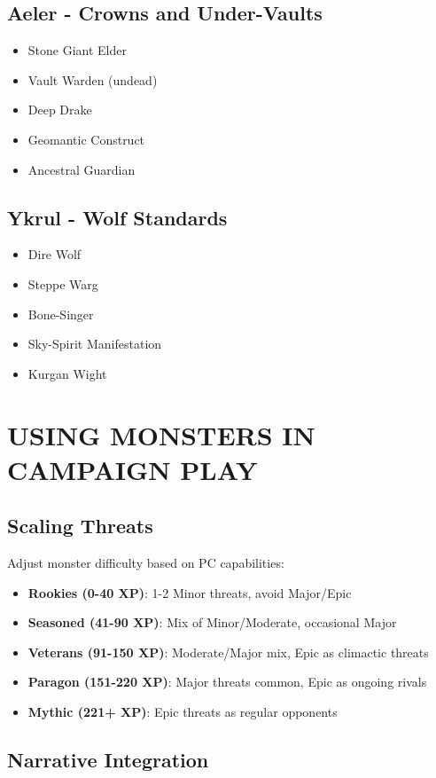 \documentclass[12pt]{article}
\begin{document}
\begin{itemize}
\subsection*{Aeler - Crowns and Under-Vaults}
\begin{itemize}
\item Stone Giant Elder
\item Vault Warden (undead)
\item Deep Drake
\item Geomantic Construct
\item Ancestral Guardian
\end{itemize}

\subsection*{Ykrul - Wolf Standards}
\begin{itemize}
\item Dire Wolf
\item Steppe Warg
\item Bone-Singer
\item Sky-Spirit Manifestation
\item Kurgan Wight
\end{itemize}

\section{USING MONSTERS IN CAMPAIGN PLAY}

\subsection*{Scaling Threats}

Adjust monster difficulty based on PC capabilities:
\begin{itemize}
\item \textbf{Rookies (0-40 XP)}: 1-2 Minor threats, avoid Major/Epic
\item \textbf{Seasoned (41-90 XP)}: Mix of Minor/Moderate, occasional Major
\item \textbf{Veterans (91-150 XP)}: Moderate/Major mix, Epic as climactic threats
\item \textbf{Paragon (151-220 XP)}: Major threats common, Epic as ongoing rivals
\item \textbf{Mythic (221+ XP)}: Epic threats as regular opponents
\end{itemize}

\subsection*{Narrative Integration}


\end{itemize}
\end{document}
